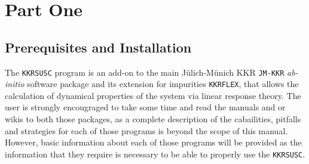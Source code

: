 \documentclass[11pt,fleqn]{book} %
\begin{document}



\pagestyle{empty} %

\tableofcontents %

\cleardoublepage %

\pagestyle{fancy} %


\part{Part One}



\chapter{Prerequisites and Installation}
The \verb;KKRSUSC; program is an add-on to the main J\"ulich-M\"unich KKR \verb;JM-KKR; \textit{ab-initio} software package and its extension for impurities \verb;KKRFLEX;, that allows the calculation of dynamical properties of the system via linear response theory. The user is strongly encougraged to take some time and read the manuals and or wikis to both those packages, as a complete description of the cabailities, pitfalls and strategies for each of those programs is beyond the scope of this manual. However, basic information about each of those programs will be provided as the information that they require is necessary to be able to properly use the \verb;KKRSUSC;. 
\end{document}
